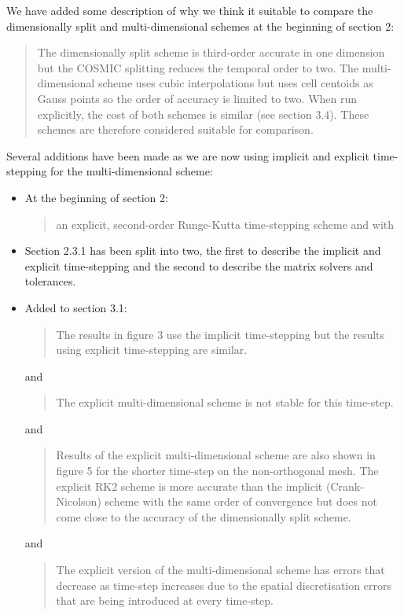 \documentclass[12pt]{article}
\begin{document}
\begin{description}
We have added some description of why we think it suitable to compare the dimensionally split and multi-dimensional schemes at the beginning of section 2:
\begin{quote}
The dimensionally split scheme is third-order accurate in one dimension but the COSMIC splitting reduces the temporal order to two. The multi-dimensional scheme uses cubic interpolations but uses cell centoids as Gauss points so the order of accuracy is limited to two. When run explicitly, the cost of both schemes is similar (see section 3.4). These schemes are therefore considered suitable for comparison. 
\end{quote}

Several additions have been made as we are now using implicit and explicit time-stepping for the multi-dimensional scheme:

\begin{itemize}
\item At the beginning of section 2:
\begin{quote}
an explicit, second-order Runge-Kutta time-stepping scheme and with
\end{quote}

\item
Section 2.3.1 has been split into two, the first to describe the implicit and explicit time-stepping and the second to describe the matrix solvers and tolerances. 

\item Added to section 3.1:
\begin{quote}
The results in figure 3 use the implicit time-stepping but the results using explicit time-stepping are similar. 
\end{quote}
and
\begin{quote}
The explicit multi-dimensional scheme is not stable for this time-step.
\end{quote}
and
\begin{quote}
Results of the explicit multi-dimensional scheme are also shown in figure 5 for the shorter time-step on the non-orthogonal mesh. The explicit RK2 scheme is more accurate than the implicit (Crank-Nicolson) scheme with the same order of convergence but does not come close to the accuracy of the dimensionally split scheme.
\end{quote}
and
\begin{quote}
The explicit version of the multi-dimensional scheme has errors that decrease as time-step increases due to the spatial discretisation errors that are being introduced at every time-step. 
\end{quote}


\end{itemize}
\end{description}
\end{document}
